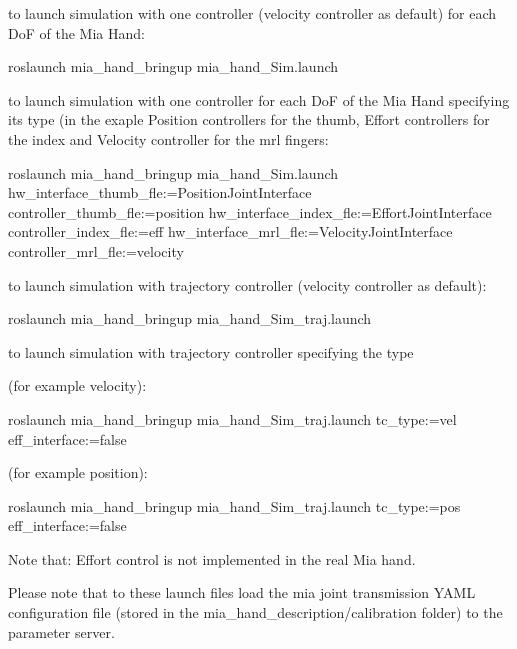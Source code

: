 \begin{DoxyItemize}
\item to launch simulation with one controller (velocity controller as default) for each DoF of the Mia Hand\+: \begin{DoxyVerb}roslaunch mia_hand_bringup mia_hand_Sim.launch
\end{DoxyVerb}

\item to launch simulation with one controller for each DoF of the Mia Hand specifying its type (in the exaple Position controllers for the thumb, Effort controllers for the index and Velocity controller for the mrl fingers\+: \begin{DoxyVerb}roslaunch mia_hand_bringup mia_hand_Sim.launch hw_interface_thumb_fle:=PositionJointInterface controller_thumb_fle:=position hw_interface_index_fle:=EffortJointInterface controller_index_fle:=eff hw_interface_mrl_fle:=VelocityJointInterface controller_mrl_fle:=velocity
\end{DoxyVerb}

\item to launch simulation with trajectory controller (velocity controller as default)\+: \begin{DoxyVerb} roslaunch mia_hand_bringup mia_hand_Sim_traj.launch
\end{DoxyVerb}

\item to launch simulation with trajectory controller specifying the type
\begin{DoxyItemize}
\item (for example velocity)\+: \begin{DoxyVerb}roslaunch mia_hand_bringup mia_hand_Sim_traj.launch tc_type:=vel eff_interface:=false
\end{DoxyVerb}

\item (for example position)\+: \begin{DoxyVerb}roslaunch mia_hand_bringup mia_hand_Sim_traj.launch tc_type:=pos eff_interface:=false
\end{DoxyVerb}

\item Note that\+: Effort control is not implemented in the real Mia hand.
\end{DoxyItemize}
\end{DoxyItemize}

Please note that to these launch files load the mia joint transmission Y\+A\+ML configuration file (stored in the mia\+\_\+hand\+\_\+description/calibration folder) to the parameter server. 